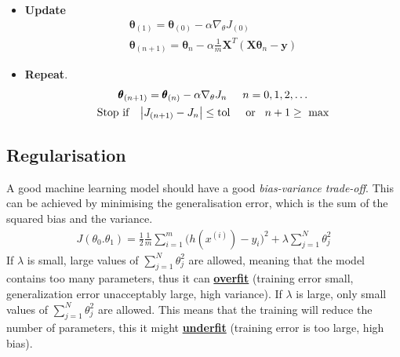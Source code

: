 \documentclass[a4paper,10pt]{article}
\begin{document}
\begin{itemize}
        \vspace*{-0.4cm}
    \item \textbf{Update}
        \begin{gather*}
            \pmb{\theta}_{(1)} = \pmb{\theta}_{(0)} - \alpha\nabla_\theta J_{(0)}\\
            \pmb{\theta}_{(n+1)} = \pmb{\theta}_n - \alpha\frac{1}{m}\mathbf{X}^T(\mathbf{X}\pmb{\theta}_n-\pmb{y})
        \end{gather*}
    \item \textbf{Repeat}.
        \begin{gather*}
            \pmb{\theta}_{(n+1)} = \pmb{\theta}_{(n)} - \alpha\nabla_\theta J_{n}\hspace*{0.5cm}n = 0,1,2,\dots\\
            \text{Stop if}\hspace*{0.3cm}\left| J_{(n+1)}-J_n \right|\leq\text{tol}\hspace*{0.5cm}\text{or}\hspace*{0.3cm}n+1\geq\text{ max}
        \end{gather*}
\end{itemize}

\subsection{Regularisation}
A good machine learning model should have a good \textit{bias-variance trade-off}. This can be achieved by minimising the generalisation error, which is the sum of the squared bias and the variance. 
\begin{gather*}
    J(\theta_0. \theta_1) = \frac{1}{2}\frac{1}{m}\sum_{i=1}^{m}\Big(h(x^{(i)})-y_i\Big)^2 + \lambda\sum_{j=1}^{N}\theta_j^2
\end{gather*}
If $\lambda$ is small, large values of $\sum_{j=1}^{N}\theta_j^2$ are allowed, meaning that the model contains too many parameters, thus it can \textbf\underline{{overfit}} (training error small, generalization error unacceptably large, high variance). If $\lambda$ is large, only small values of $\sum_{j=1}^{N}\theta_j^2$ are allowed. This means that the training will reduce the number of parameters, this it might \underline{\textbf{underfit}} (training error is too large, high bias). 
\end{document}
